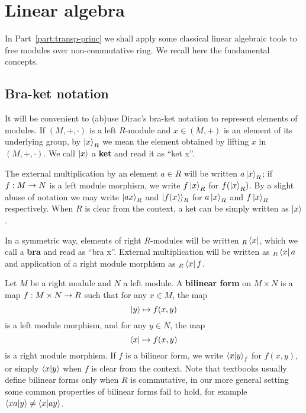 \section{Linear algebra}
\label{sec:linear-algebra}
In Part~\ref{part:transp-princ} we shall apply some classical linear
algebraic tools to free modules over non-commutative ring. We recall
here the fundamental concepts.


\subsection{Bra-ket notation}
\label{sec:linear-algebra:bra-ket}

It will be convenient to (ab)use Dirac's
bra-ket notation to represent elements of
modules. If $(M,+,\cdot)$ is a left $R$-module and $x\in (M,+)$ is an
element of its underlying group, by $\left\lvert x \right\rangle_R$ we mean the element
obtained by lifting $x$ in $(M,+,\cdot)$. We call
$\left\lvert x \right\rangle$ a
\textbf{ket} and read it as ``ket x''.

The external multiplication by an element $a\in R$ will be written
$a\left\lvert x \right\rangle_R$; if $f:M\rightarrow N$ is a left module morphism, we write
$f\left\lvert x \right\rangle_R$ for $f(\left\lvert x \right\rangle_R)$. By a slight abuse of notation we may
write $\left\lvert a x \right\rangle_R$ and $\left\lvert f(x) \right\rangle_R$ for $a\left\lvert x \right\rangle_R$ and
$f\left\lvert x \right\rangle_R$ respectively. When $R$ is clear from the context, a ket
can be simply written as $\left\lvert x \right\rangle$.

In a symmetric way, elements of right $R$-modules will be written
${}_R\left\langle x \right\rvert$, which we call a \textbf{bra} and read as
``bra x''. External multiplication will be written as ${}_R\left\langle x \right\rvert a$
and application of a right module morphism as ${}_R\left\langle x \right\rvert f$.

Let $M$ be a right module and $N$ a left module. A
\textbf{bilinear
  form} on
$M\times N$ is a map $f:M\times N\rightarrow R$ such that for any $x\in M$,
the map
\[\left\lvert y \right\rangle\mapsto f(x, y)\]
is a left module morphism, and for any $y\in N$, the map
\[\left\langle x \right\rvert\mapsto f(x, y)\]
is a right module morphism. If $f$ is a bilinear form, we write
$\left\langle x \middle| y \right\rangle_f$ for $f(x,y)$, or simply $\left\langle x \middle| y \right\rangle$
when $f$ is clear from the context. Note that textbooks usually define
bilinear forms only when $R$ is commutative, in our more general
setting some common properties of bilinear forms fail to hold,
for example $\left\langle xa \middle| y \right\rangle\ne\left\langle x \middle| ay \right\rangle$.

